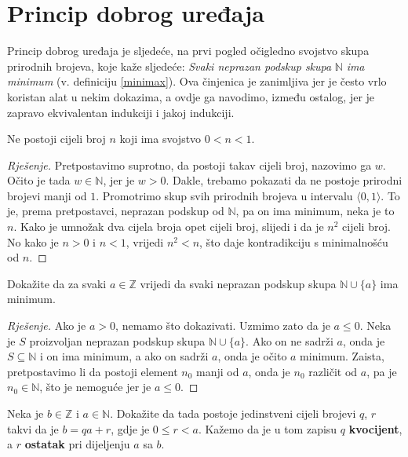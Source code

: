 \section{Princip dobrog uređaja}
Princip dobrog uređaja je sljedeće, na prvi pogled očigledno svojstvo skupa prirodnih brojeva, koje kaže sljedeće: \textit{Svaki neprazan podskup skupa} $\mathbb{N}$ \textit{ima minimum} (v. definiciju \ref{minimax}). Ova činjenica je zanimljiva jer je često vrlo koristan alat u nekim dokazima, a ovdje ga navodimo, između ostalog, jer je zapravo ekvivalentan indukciji i jakoj indukciji.
\begin{exercise}
\label{23}
Ne postoji cijeli broj $n$ koji ima svojstvo $0<n<1$.
\end{exercise}
\begin{proof}[Rješenje]
Pretpostavimo suprotno, da postoji takav cijeli broj, nazovimo ga $w$. Očito je tada $w\in \mathbb{N}$, jer je $w>0$. Dakle, trebamo pokazati da ne postoje prirodni brojevi manji od $1$. Promotrimo skup svih prirodnih brojeva u intervalu $\langle 0, 1\rangle$. To je, prema pretpostavci, neprazan podskup od $\mathbb{N}$, pa on ima minimum, neka je to $n$. Kako je umnožak dva cijela broja opet cijeli broj, slijedi i da je $n^2$ cijeli broj. No kako je $n>0$ i $n<1$, vrijedi $n^2<n$, što daje kontradikciju s minimalnošću od $n$.
\end{proof}
\begin{exercise}
\label{24}
Dokažite da za svaki $a\in \mathbb{Z}$ vrijedi da svaki neprazan podskup skupa $\mathbb{N}\cup\{a\}$ ima minimum.
\end{exercise}
\begin{proof}[Rješenje]
Ako je $a>0$, nemamo što dokazivati. Uzmimo zato da je $a\leq 0$. Neka je $S$ proizvoljan neprazan podskup skupa $\mathbb{N}\cup\{a\}$. Ako on ne sadrži $a$, onda je $S\subseteq \mathbb{N}$ i on ima minimum, a ako on sadrži $a$, onda je očito $a$ minimum. Zaista, pretpostavimo li da postoji element $n_0$ manji od $a$, onda je $n_0$ različit od $a$, pa je $n_0\in \mathbb{N}$, što je nemoguće jer je $a\leq 0$.
\end{proof}
\begin{exercise}
Neka je $b\in \mathbb{Z}$ i $a\in \mathbb{N}$. Dokažite da tada postoje jedinstveni cijeli brojevi $q$, $r$ takvi da je $b=qa+r$, gdje je $0\leq r<a$. Kažemo da je u tom zapisu $q$ \textbf{kvocijent}, a $r$ \textbf{ostatak} pri dijeljenju $a$ sa $b$.
\end{exercise}
